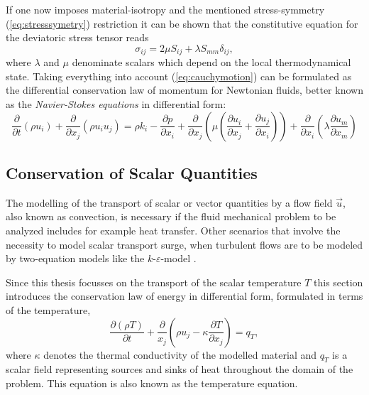    If one now imposes material-isotropy and the mentioned stress-symmetry (\ref{eq:stresssymetry}) restriction it can be shown \cite{aris62} that the constitutive equation for the deviatoric stress tensor reads 
    \begin{displaymath}
      \sigma_{ij} = 2 \mu S_{ij} + \lambda S_{mm} \delta_{ij},
    \end{displaymath}
    where \(\lambda\) and \(\mu\) denominate scalars which depend on the local thermodynamical state. Taking everything into account (\ref{eq:cauchymotion}) can be formulated as the differential conservation law of momentum for Newtonian fluids, better known as the \emph{Navier-Stokes equations} in differential form:
    \begin{equation}
      \label{eq:nsfull}
      \frac{\partial }{\partial t} \left(\rho u_i \right)
      + \frac{\partial}{\partial x_j} \left( \rho u_i  u_j \right) 
      = \rho k_i
      - \frac{\partial p}{\partial x_i}
      + \frac{\partial}{\partial x_j} \left( \mu  \left( \frac{\partial u_i}{\partial x_j} 
                                              + \frac{\partial u_j}{\partial x_i} \right) \right)
      + \frac{\partial}{\partial x_i} \left(\lambda \frac{\partial u_m}{\partial x_m} \right)
    \end{equation}

    \subsection{Conservation of Scalar Quantities}

    The modelling of the transport of scalar or vector quantities by a flow field \(\vec{u}\), also known as convection, is necessary if the fluid mechanical problem to be analyzed includes for example heat transfer. Other scenarios that involve the necessity to model scalar transport surge, when turbulent flows are to be modeled by two-equation models like the \(k\)-\(\varepsilon\)-model \cite{pope00}. 
    
    Since this thesis focusses on the transport of the scalar temperature \(T\) this section introduces the conservation law of energy in differential form, formulated in terms of the temperature,
    \begin{equation}
      \frac{\partial \left(\rho T \right)}{\partial t} + \frac{\partial}{x_j} \left( \rho u_j - \kappa \frac{\partial T}{\partial x_j} \right) = q_T,
    \end{equation}
    where \(\kappa\) denotes the thermal conductivity of the modelled material and \(q_T\) is a scalar field representing sources and sinks of heat throughout the domain of the problem. This equation is also known as the temperature equation.

